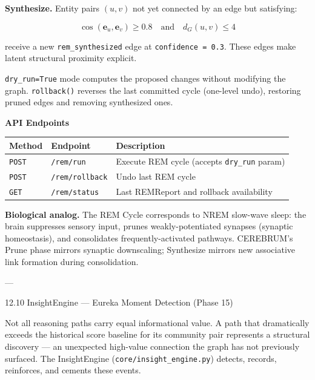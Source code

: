 \documentclass[10pt,journal,compsoc]{IEEEtran}
\begin{document}
\textbf{Synthesize.} Entity pairs $(u, v)$ not yet connected by an edge but satisfying:

\begin{equation}
\cos(\mathbf{e}_u, \mathbf{e}_v) \geq 0.8 \quad \text{and} \quad d_G(u, v) \leq 4
\end{equation}

receive a new \texttt{rem\_synthesized} edge at \texttt{confidence = 0.3}. These edges make latent structural proximity explicit.

\texttt{dry\_run=True} mode computes the proposed changes without modifying the graph. \texttt{rollback()} reverses the last committed cycle (one-level undo), restoring pruned edges and removing synthesized ones.

\textbf{API Endpoints}

\begin{center}
{\footnotesize
\begin{tabularx}{\columnwidth}{|>{\raggedright\arraybackslash}X|>{\raggedright\arraybackslash}X|>{\raggedright\arraybackslash}X|}
\hline
Method & Endpoint & Description \\ \hline
\texttt{POST} & \texttt{/rem/run} & Execute REM cycle (accepts \texttt{dry\_run} param) \\ \hline
\texttt{POST} & \texttt{/rem/rollback} & Undo last REM cycle \\ \hline
\texttt{GET} & \texttt{/rem/status} & Last REMReport and rollback avail\-ability \\ \hline
\end{tabularx}
}
\end{center}

\textbf{Biological analog.} The REM Cycle corresponds to NREM slow-wave sleep: the brain suppresses sensory input, prunes weakly-potentiated synapses (synaptic homeostasis), and conso\-lidates frequently-activated pathways. CEREBRUM's Prune phase mirrors synaptic downscaling; Synthesize mirrors new associative link formation during conso\-lidation.

---

12.10 InsightEngine — Eureka Moment Detection (Phase 15)

Not all reasoning paths carry equal infor\-mational value. A path that drama\-tically exceeds the historical score baseline for its community pair represents a structural discovery — an unexpected high-value connection the graph has not previously surfaced. The InsightEngine (\texttt{core/insight\_engine.py}) detects, records, reinforces, and cements these events.
\end{document}
